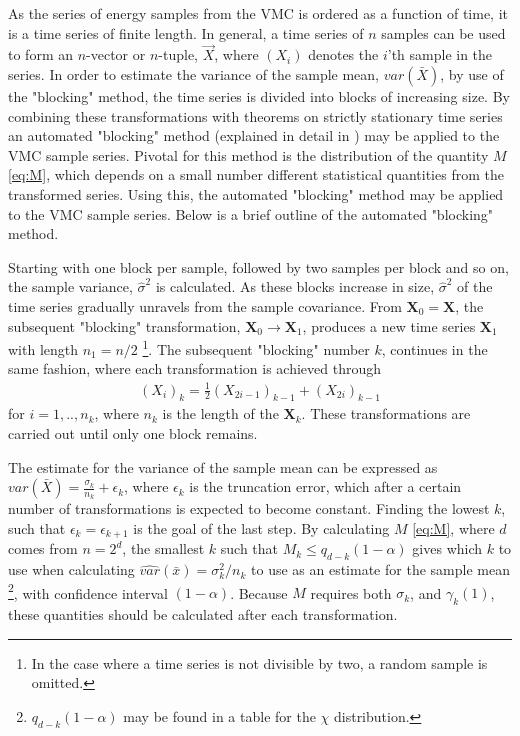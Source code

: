\documentclass[%
oneside,                 %
final,                   %
10pt]{article}
\begin{document}
As the series of energy samples from the VMC is ordered as a function of time, it is a time series of finite length. In general, a time series of $n$ samples can be used to form an $n$-vector or $n$-tuple, $\vec X$, where $(X_i)$ denotes the $i$'th sample in the series. In order to estimate the variance of the sample mean, $var (\bar X)$, by use of  the "blocking" method, the time series is divided into blocks of increasing size. By combining these transformations with theorems on strictly stationary time series an automated "blocking" method (explained in detail in \cite{Jonsson}) may be applied to the VMC sample series. Pivotal for this method is the distribution of the quantity $M$ \eqref{eq:M}, which depends on a small number different statistical quantities from the transformed series. Using this, the automated "blocking" method may be applied to the VMC sample series. Below is a brief outline of the automated "blocking" method.

Starting with one block per sample, followed by two samples per block and so on, the sample variance, $\hat \sigma^2$ is calculated. As these blocks increase in size, $\hat \sigma^2$ of the time series gradually unravels from the sample covariance. From $\bm X_0=\bm X$, the subsequent "blocking" transformation, $\bm X_0 \rightarrow \bm X_1$, produces a new time series $\bm X_1$ with length $n_1=n/2$ \footnote{In the case where a time series is not divisible by two, a random sample is omitted.}. The subsequent "blocking" number $k$, continues in the same fashion, where each transformation is achieved through 
\begin{align}
(X_i)_k=\frac{1}{2} (X_{2i-1})_{k-1} + (X_{2i})_{k-1}
\end{align}
for $i=1,..,n_k$, where $n_k$ is the length of the $\bm X_k$. These transformations are carried out until only one block remains.

The estimate for the variance of the sample mean can be expressed as $var(\bar X) = \frac{\sigma_k}{n_k}+\epsilon_k$, where $\epsilon_k$ is the truncation error, which after a certain number of transformations is expected to become constant. Finding the lowest $k$, such that $\epsilon_k=\epsilon_{k+1}$ is the goal of the last step. By calculating $M$ \eqref{eq:M}, where $d$ comes from $n=2^d$, the smallest $k$ such that $M_k\leq q_{d-k}(1-\alpha)$ gives which $k$ to use when calculating $\hat {var} (\bar x) = \sigma_k^2/n_k$ to use as an estimate for the sample mean \footnote{$q_{d-k}(1-\alpha)$ may be found in a table for the $\chi$ distribution.}, with confidence interval $(1-\alpha)$. Because $M$ requires both $\sigma_k$, and $ \gamma_k(1)$, these quantities should be calculated after each transformation.
\end{document}
